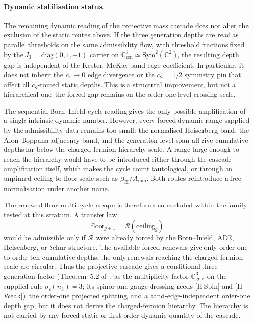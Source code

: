 \documentclass[11pt]{article}
\theoremstyle{definition}
\theoremstyle{remark}
\newcommand{\Cgen}{\mathbb{C}^{3}_{\mathrm{gen}}}
\begin{document}
    \paragraph{Dynamic stabilisation status.}
      The remaining dynamic reading of the projective mass cascade does not alter the exclusion
      of the static routes above.
      If the three generation depths are read as parallel thresholds on the same admissibility
      flow, with threshold fractions fixed by the \(J_3=\mathrm{diag}(0,1,-1)\) carrier on
      \(\mathbb{C}^3_{\mathrm{gen}}\simeq\mathrm{Sym}^2(\mathbb{C}^2)\), the resulting depth
      gap is independent of the Kesten--McKay band-edge coefficient.
      In particular, it does not inherit the \(c_1\to 0\) edge divergence or the \(c_2=1/2\)
      symmetry pin that affect all \(c_g\)-routed static depths.
      This is a structural improvement, but not a hierarchical one: the forced gap remains
      on the order-one level-crossing scale.

      The sequential Born--Infeld cycle reading gives the only possible amplification of a
      single intrinsic dynamic number.
      However, every forced dynamic range supplied by the admissibility data remains too small:
      the normalised Heisenberg band, the Alon--Boppana adjacency band, and the generation-level
      span all give cumulative depths far below the charged-fermion hierarchy scale.
      A range large enough to reach the hierarchy would have to be introduced either through
      the cascade amplification itself, which makes the cycle count tautological, or through an
      unpinned ceiling-to-floor scale such as \(\beta_{\mathrm{BI}}/A_{\min}\).
      Both routes reintroduce a free normalisation under another name.

      The renewed-floor multi-cycle escape is therefore also excluded within the family tested at this stratum.
      A transfer law
      \[
        \mathrm{floor}_{g+1}=\mathcal{R}(\mathrm{ceiling}_g)
      \]
      would be admissible only if \(\mathcal{R}\) were already forced by the
      Born--Infeld, ADE, Heisenberg, or Schur structure.
      The available forced renewals give only order-one to order-ten cumulative depths; the
      only renewals reaching the charged-fermion scale are circular.
      Thus the projective cascade gives a conditional three-generation factor (Theorem~5.2 of~\cite{Beau2026q14}, as the
      multiplicity factor $\Cgen$, on the supplied rule $\sigma_{c}(n_{3}) = 3$; its spinor and gauge dressing needs
      [H-Spin] and [H-Weak]),
      the order-one projected
      splitting, and a band-edge-independent order-one depth gap, but it does not derive the
      charged-fermion hierarchy.
      The hierarchy is not carried by any forced static or first-order dynamic quantity of the
      cascade.
\end{document}
